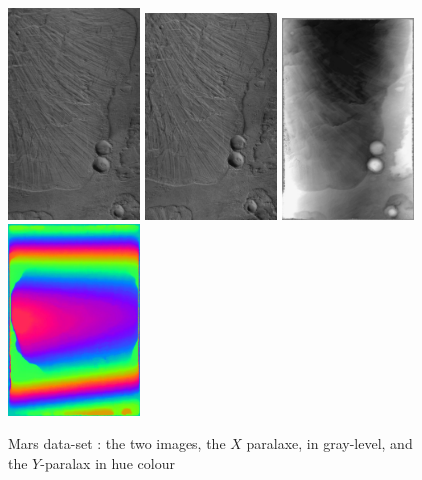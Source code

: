 \begin{figure}
\begin{center}
\includegraphics[width=35mm]{FIGS/Mars/SmaIm1.jpg}
\includegraphics[width=35mm]{FIGS/Mars/SmIm2.jpg}
\includegraphics[width=35mm]{FIGS/Mars/Px1.jpg}
\includegraphics[width=35mm]{FIGS/Mars/Px2.jpg}

\end{center}
\caption{Mars data-set : the two  images, the $X$ paralaxe, in gray-level, and the $Y$-paralax in 
hue colour}
\label{FIG:OK:Mars}
\end{figure}

